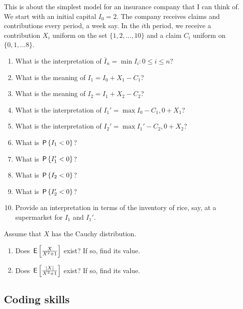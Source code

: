\documentclass[assignments]{subfiles}
\begin{document}
\begin{exercise}
This is about the simplest model for an insurance company that I can think of.
We start with an initial capital $I_0=2$.
The company receives claims and contributions every period, a week say.
In the $i$th period, we receive a contribution $X_{i}$ uniform on the set $\{1, 2,\ldots,10\}$ and a claim $C_i$ uniform on $\{0, 1, \ldots 8\}$.
\begin{enumerate}
\item What is the interpretation of $\bar I_{n} = \min{I_{i} : 0\leq i\leq n}$? 
\item What is the meaning of $I_1=I_0+X_1-C_1$?
\item What is the meaning of $I_2=I_1+X_2-C_2$?
\item What is the interpretation of $I_1'=\max{I_0-C_1,0} + X_1$?
\item What is the interpretation of $I_2'=\max{I_1'-C_2,0} + X_2$?
\item What is  $\P{I_1 < 0}$?
\item What is  $\P{I_1' < 0}$?
\item What is  $\P{I_2 < 0}$?
\item What is  $\P{I_2' < 0}$?
\item Provide an interpretation in terms of the inventory of rice, say, at a supermarket for $I_{1}$ and $I_{1}'$.
\end{enumerate}
\end{exercise}



\begin{exercise} %
Assume that $X$ has the Cauchy distribution. 
\begin{enumerate}
\item Does $\E{\frac{X}{X^2+1}}$ exist? If so, find its value. 
\item Does $\E{\frac{|X|}{X^2+1}}$ exist? If so, find its value. 
\end{enumerate}
\end{exercise}


\subsection{Coding skills}
\label{sec:coding-skills}
\end{document}
